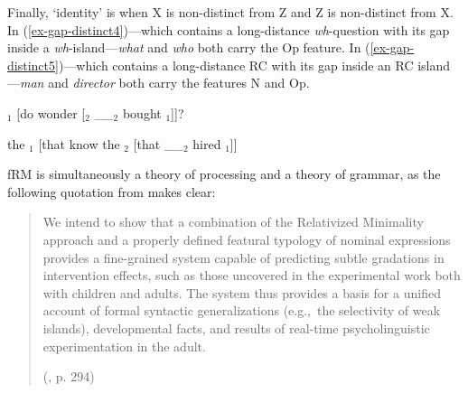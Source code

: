 Finally, `identity' is when X is non-distinct from Z and Z is non-distinct from X. In (\ref{ex-gap-distinct4})---which contains a long-distance \textit{wh}-question with its gap inside a \textit{wh}-island---\textit{what} and \textit{who} both carry the Op feature. In (\ref{ex-gap-distinct5})---which contains a long-distance RC with its gap inside an RC island---\textit{man} and \textit{director} both carry the features N and Op.

\pex \label{ex-gap-distinct4}
\ljudge*{}$_1$ [do  wonder [$_2$ \_\_$_2$ bought $_1$]]?
\vspace{18pt}
\xe 

\pex \label{ex-gap-distinct5}
\ljudge*the $_1$ [that  know the $_2$ [that \_\_$_2$ hired $_1$]]
\vspace{24pt}
\xe 

fRM is simultaneously a theory of processing and a theory of grammar, as the following quotation from \textcite{belletti.rizzi2013} makes clear:

\begin{quote}
We intend to show that a combination of the Relativized Minimality approach and a properly defined featural typology of nominal expressions provides a fine-grained system capable of predicting subtle gradations in intervention effects, such as those uncovered in the experimental work both with children and adults. The system thus provides a basis for a unified account of formal syntactic generalizations (e.g.,~the selectivity of weak islands), developmental facts, and results of real-time psycholinguistic experimentation in the adult.
\par\nobreak\vspace{5pt}
\hfill (\cite{belletti.rizzi2013}, p. 294)
\end{quote}
\vspace{-6pt}


